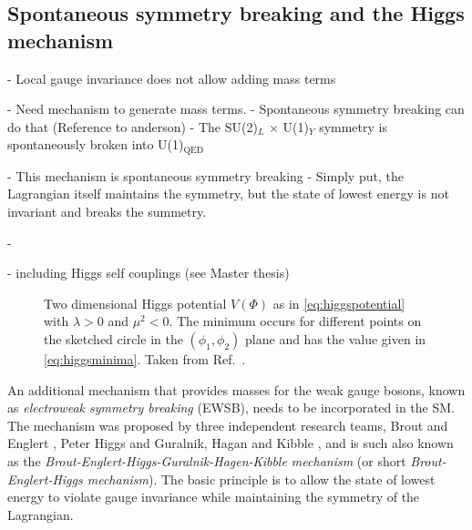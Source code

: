 \subsection{Spontaneous symmetry breaking and the Higgs mechanism}
\label{sec:ewsymbreaking}
- Local gauge invariance does not allow adding mass terms

- Need mechanism to generate mass terms.
- Spontaneous symmetry breaking can do that (Reference to anderson)
- The SU(2)$_L$ $\times$ U(1)$_Y$ symmetry is spontaneously broken into U(1)$_\text{QED}$

- This mechanism is spontaneous symmetry breaking
- Simply put, the Lagrangian itself maintains the symmetry, but the state of lowest energy is not invariant and breaks the summetry.

-





- including Higgs self couplings (see Master thesis)








\begin{figure}
  \caption[Two dimensional Higgs potential $V(\Phi)$ with $\lambda > 0$ and $\mu^2 < 0$.]{Two dimensional Higgs potential $V(\Phi)$ as in \cref{eq:higgspotential} with $\lambda > 0$ and $\mu^2 < 0$. The minimum occurs for different points on the sketched circle in the $(\phi_1, \phi_2)$ plane and has the value given in \cref{eq:higgsminima}. Taken from Ref.~\cite{Halzen:1984mc}.
  }
  \label{fig:higgspotential}
\end{figure}

An additional mechanism that provides masses for the weak gauge bosons, known as \emph{electroweak symmetry breaking} (EWSB), needs to be incorporated in the SM.
The mechanism was proposed by three independent research teams, Brout and Englert \cite{PhysRevLett.13.321}, Peter Higgs \cite{PhysRevLett.13.508,HIGGS1964132} and Guralnik, Hagan and Kibble \cite{PhysRevLett.13.585}, and is such also known as the \emph{Brout-Englert-Higgs-Guralnik-Hagen-Kibble mechanism} (or short \emph{Brout-Englert-Higgs mechanism}).
The basic principle is to allow the state of lowest energy to violate gauge invariance while maintaining the symmetry of the Lagrangian.

